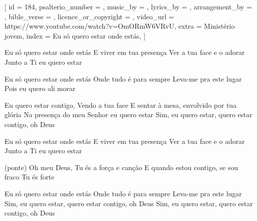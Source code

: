 [
    id                     = {184},
    psalterio_number       = {},
    music_by               = {},
    lyrics_by              = {},
    arrangement_by         = {},
    bible_verse            = {},
    licence_or_copyright   = {},
    video_url              = {https://www.youtube.com/watch?v=OmORmW6VRvU},
    extra                  = {Ministério jovem},
    index                  = {Eu só quero estar onde estás},
]

\beginverse
Eu só quero estar onde estás
E viver em tua presença
Ver a tua face e o adorar
Junto a Ti eu quero estar
\endverse

\beginverse
Eu só quero estar onde estás
Onde tudo é para sempre
Leva-me pra este lugar
Pois eu quero ali morar
\endverse

\beginchorus
Eu quero estar contigo,
Vendo a tua face
E sentar à mesa, envolvido por tua glória
Na presença do meu Senhor eu quero estar
Sim, eu quero estar, quero estar contigo, oh Deus
\endchorus


\beginverse
Eu só quero estar onde estás
E viver em tua presença
Ver a tua face e o adorar
Junto a Ti eu quero estar

(ponte)
Oh meu Deus, Tu és a força e canção
E quando estou contigo, se sou fraco Tu és forte
\endverse

\beginverse
Eu só quero estar onde estás
Onde tudo é para sempre
Leva-me pra este lugar
Sim, eu quero estar, quero estar contigo, oh Deus
Sim, eu quero estar, quero estar contigo, oh Deus
\endverse

\endsong
